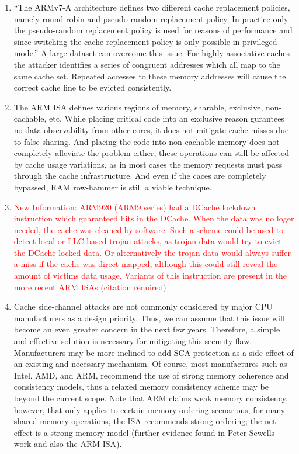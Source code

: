\begin{enumerate}
	\item ``The ARMv7-A architecture defines two different cache replacement policies, namely round-robin and pseudo-random replacement policy. In practice only the pseudo-random replacement policy is used for reasons of performance and since switching the cache replacement policy is only possible in privileged mode.'' A large dataset can overcome this issue. For highly associative caches the attacker identifies a series of congruent addresses which all map to the same cache set. Repeated accesses to these memory addresses will cause the correct cache line to be evicted consistently.
	\item The ARM ISA defines various regions of memory, sharable, exclusive, non-cachable, etc. While placing critical code into an exclusive reason gurantees no data observability from other cores, it does not mitigate cache misses due to false sharing. And placing the code into non-cachable memory does not completely alleviate the problem either, these operations can still be affected by cache usage variations, as in most cases the memory requests must pass through the cache infrastructure. And even if the caces are completely bypassed, RAM row-hammer is still a viable technique.
	\item \textcolor{red}{New Information: ARM920 (ARM9 series) had a DCache lockdown instruction which guaranteed hits in the DCache. When the data was no loger needed, the cache was cleaned by software. Such a scheme could be used to detect local or LLC based trojan attacks, as trojan data would try to evict the DCache locked data. Or alternatively the trojan data would always suffer a miss if the cache was direct mapped, although this could still reveal the amount of victims data usage. Variants of this instruction are present in the more recent ARM ISAs (citation required)}
	\item Cache side-channel attacks are not commonly considered by major CPU manufacturers as a design priority. Thus, we can assume that this issue will become an even greater concern in the next few years. Therefore, a simple and effective solution is necessary for mitigating this security flaw. Manufacturers may be more inclined to add SCA protection as a side-effect of an existing and necessary mechanism. Of course, most manufactures such as Intel, AMD, and ARM, recommend the use of strong memory coherence and consistency models, thus a relaxed memory consistency scheme may be beyond the current scope. Note that ARM claims weak memory consistency, however, that only applies to certain memory ordering scenarious, for many shared memory operations, the ISA recommends strong ordering; the net effect is a strong memory model (further evidence found in Peter Sewells work and also the ARM ISA).
	\end{enumerate}
	

